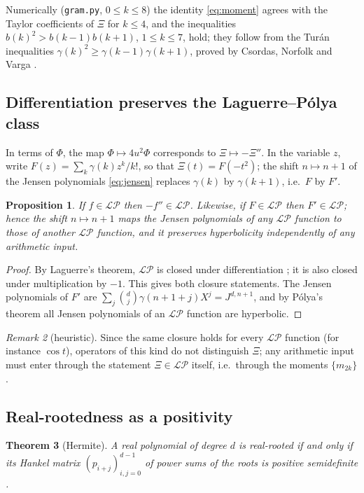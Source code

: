 \documentclass[11pt]{amsart}
\newtheorem{theorem}{Theorem}[section]
\newtheorem{proposition}[theorem]{Proposition}
\theoremstyle{definition}
\theoremstyle{remark}
\newtheorem{remark}[theorem]{Remark}
\newcommand{\LP}{\mathcal{LP}}
\begin{document}
Numerically (\texttt{gram.py}, $0\le k\le8$) the identity \eqref{eq:moment} agrees with the Taylor coefficients
of $\Xi$ for $k\le4$, and the inequalities $b(k)^2>b(k-1)b(k+1)$, $1\le k\le7$, hold; they follow from the
Turán inequalities $\gamma(k)^2\ge\gamma(k-1)\gamma(k+1)$, proved by Csordas, Norfolk and Varga \cite{CNV}.

\subsection{Differentiation preserves the Laguerre--Pólya class}
In terms of $\Phi$, the map $\Phi\mapsto4u^2\Phi$ corresponds to $\Xi\mapsto-\Xi''$. In the variable $z$, write
$F(z)=\sum_k\gamma(k)z^k/k!$, so that $\Xi(t)=F(-t^2)$; the shift $n\mapsto n+1$ of the Jensen polynomials
\eqref{eq:jensen} replaces $\gamma(k)$ by $\gamma(k+1)$, i.e.\ $F$ by $F'$.

\begin{proposition}\label{prop:blind}
If $f\in\LP$ then $-f''\in\LP$. Likewise, if $F\in\LP$ then $F'\in\LP$; hence the shift $n\mapsto n+1$ maps the
Jensen polynomials of any $\LP$ function to those of another $\LP$ function, and it preserves hyperbolicity
independently of any arithmetic input.
\end{proposition}

\begin{proof}
By Laguerre's theorem, $\LP$ is closed under differentiation \cite[Ch.~VIII]{Levin}; it is also closed under
multiplication by $-1$. This gives both closure statements. The Jensen polynomials of $F'$ are
$\sum_j\binom dj\gamma(n+1+j)X^j=J^{d,n+1}$, and by Pólya's theorem \cite{Polya} all Jensen polynomials of an
$\LP$ function are hyperbolic.
\end{proof}

\begin{remark}[heuristic]
Since the same closure holds for every $\LP$ function (for instance $\cos t$), operators of this kind do not
distinguish $\Xi$; any arithmetic input must enter through the statement $\Xi\in\LP$ itself, i.e.\ through the
moments $\{m_{2k}\}$.
\end{remark}

\subsection{Real-rootedness as a positivity}
\begin{theorem}[Hermite]\label{thm:hermite}
A real polynomial of degree $d$ is real-rooted if and only if its Hankel matrix $(p_{i+j})_{i,j=0}^{d-1}$ of
power sums of the roots is positive semidefinite \cite{Hermite,Obreschkoff}.
\end{theorem}
\end{document}
